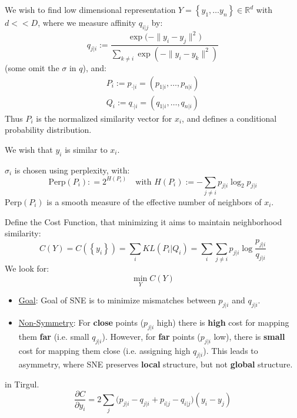 \documentclass{article}
\begin{document}
\begin{theorem} We wish to find low dimensional representation $Y = \left\{ y_1, \ldots  y_n \right\} \in \mathbb{R}^{d}$ with $d << D$, where we measure affinity $q_{i|j}$ by:
\[
  q_{j | i } := \frac{\exp{(- \lVert  y_i -y_j \rVert ^2 }) }{\sum_{k \neq  i } \exp (- \lVert y_i-y_k \rVert ^2  )}
\]
(some omit the $\sigma$ in $q$),  and:
\begin{gather*}
  P_{i} := p_{\cdot | i} = (p_{1|i}, \ldots, p_{n|i}) \\
  Q_{i} := q_{\cdot | i} = (q_{1|i}, \ldots, q_{n|i})
\end{gather*}
Thus $P_{i}$ is the normalized similarity vector for $x_i$, and defines a conditional probability distribution. 

We wish that $y_i$ is similar to $x_i$. 
\end{theorem}

\begin{definition}[Perplexity] $\sigma_i$ is chosen using perplexity, with:
\[
  \text{Perp}(P_{i}) : = 2^{H(P_i)} \quad \text{with } H(P_i) := - \sum_{j \neq i} p_{j|i} \log_{2} p_{j|i}
\]
  $\text{Perp}(P_i)$ is a smooth measure of the effective number of neighbors of $x_i$. 
\end{definition}


\begin{definition} 
  Define the Cost Function, that minimizing it  aims to maintain neighborhood similarity:
\[
 C(Y) = C( \left\{ y_i \right\}) = \sum_{i} KL(P_i | Q_i) = \sum_{i} \sum_{j \neq i} p_{j | i} \log \frac{p_{j|i}}{q_{j|i}}
\] 
We look for:
\[
  \min_{Y} C(Y)  
\]
\begin{itemize}

  \item \ul{Goal}: Goal of SNE is to minimize mismatches between $p_{j|i}$ and $q_{j|i}$. 
  \item \ul{Non-Symmetry}: For \textbf{close} points ($p_{j|i}$ high) there is \textbf{high} cost for mapping them \textbf{far} (i.e. small $q_{j|i}$). However, for \textbf{far} points ($p_{j|i}$ low), there is \textbf{small} cost for mapping them close (i.e. assigning high $q_{j|i}$). This leads to asymmetry, where SNE preserves \textbf{local} structure, but not \textbf{global} structure. 
\end{itemize}
\end{definition}

\begin{theorem} in Tirgul. 
\[
  \frac{\partial C}{\partial y_i} = 2 \sum_{j} \big( p_{j|i} - q_{j|i} + p_{i|j} -q_{i|j} \big)( y_i - y_j)
\]
\end{theorem}
\end{document}
